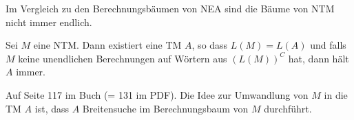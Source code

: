 Im Vergleich zu den Berechnungsbäumen von NEA sind die Bäume von NTM nicht immer endlich.

\inlinetheorem Sei $M$ eine NTM. Dann existiert eine TM $A$, so dass $L(M) = L(A)$ 
und falls $M$ keine unendlichen Berechnungen auf Wörtern aus $(L(M))^C$ hat, dann hält $A$ immer.

\inlineproof Auf Seite 117 im Buch (= 131 im PDF). Die Idee zur Umwandlung von $M$ in die TM $A$ ist, dass $A$ Breitensuche im Berechnungsbaum von $M$ durchführt.
